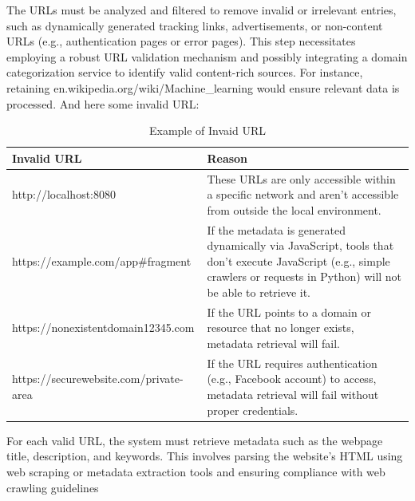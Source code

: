 \documentclass{article}
\begin{document}
The URLs must be analyzed and filtered to remove invalid or irrelevant entries, such as dynamically generated tracking links, advertisements, or non-content URLs (e.g., authentication pages or error pages). This step necessitates employing a robust URL validation mechanism and possibly integrating a domain categorization service to identify valid content-rich sources. For instance, retaining en.wikipedia.org/wiki/Machine\_learning would ensure relevant data is processed. And here some invalid URL:

\begin{table}[H]
\centering
\begin{tabular}{|p{}|p{}|}
\hline
Invalid URL & Reason \\
\hline
http://localhost:8080 &
These URLs are only accessible within a specific network and aren't accessible from outside the local environment. \\
\hline
https://example.com/app\#fragment &
If the metadata is generated dynamically via JavaScript, tools that don't execute JavaScript (e.g., simple crawlers or requests in Python) will not be able to retrieve it. \\
\hline
https://nonexistentdomain12345.com &
If the URL points to a domain or resource that no longer exists, metadata retrieval will fail. \\
\hline
https://securewebsite.com/private-area &
If the URL requires authentication (e.g., Facebook account) to access, metadata retrieval will fail without proper credentials.\\
\hline
\end{tabular}
\caption{Example of Invaid URL}
\label{table:invalid-url}
\end{table}

For each valid URL, the system must retrieve metadata such as the webpage title, description, and keywords. This involves parsing the website's HTML using web scraping or metadata extraction tools and ensuring compliance with web crawling guidelines
\end{document}
